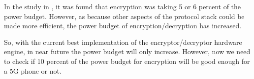 \documentclass[12pt]{article}
\begin{document}
In the study in \cite{IIS_Ruhr_2010}, it was found that encryption was taking 5 or 6 percent of the power budget. However, as because other aspects of the protocol stack could be made more efficient, the power budget of encryption/decryption has increased.

So, with the current best implementation of the encryptor/decryptor hardware engine, in near future the power budget will only increase. However, now we need to check if 10 percent of the power budget for encryption will be good enough for a 5G phone or not.








\end{document}
